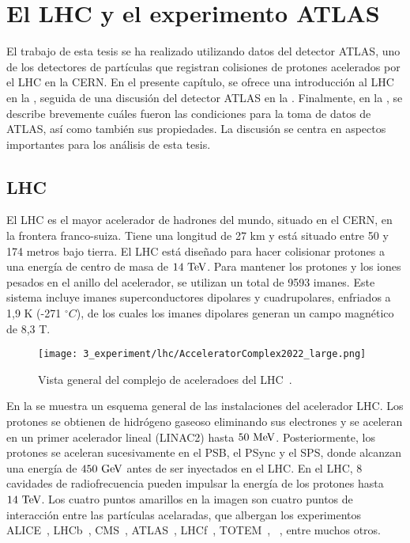 \chapter{El LHC y el experimento ATLAS}
\label{ch:atlas}


El trabajo de esta tesis se ha realizado utilizando datos del detector \ac{ATLAS}, uno de los detectores de partículas que registran colisiones de protones acelerados por el \acf{LHC} en la \ac{CERN}.
En el presente capítulo, se ofrece una introducción al \ac{LHC} en la \Sect{\ref{sec:atlas:LHC}}, seguida de una discusión del detector \ac{ATLAS} en la \Sect{\ref{sec:atlas:atlas}}. Finalmente, en la \Sect{\ref{sec:atlas:runs}}, se describe brevemente cu\'ales fueron las condiciones para la toma de datos de \ac{ATLAS}, as\'i como tambi\'en sus propiedades. La discusión se centra en aspectos importantes para los análisis de esta tesis.




\section{LHC}
\label{sec:atlas:LHC}

El \ac{LHC} \cite{LHC-TDR,LHC-Machine} es el mayor acelerador de hadrones del mundo, situado en el \ac{CERN}, en la frontera franco-suiza. Tiene una longitud de 27 km y está situado entre 50 y 174 metros bajo tierra.
El \ac{LHC} está diseñado para hacer colisionar protones a una energía de centro de masa de \(14~\text{TeV}\). Para mantener los protones y los iones pesados en el anillo del acelerador, se utilizan un total de 9593 imanes. Este sistema incluye imanes superconductores dipolares y cuadrupolares, enfriados a 1,9 K (-271 $^{\circ} C$), de los cuales los imanes dipolares generan un campo magnético de 8,3 T.

\begin{figure}[ht!]
    \centering
    \texttt{[image: 3\_experiment/lhc/AcceleratorComplex2022\_large.png]}
    \caption{Vista general del complejo de aceleradoes del \ac{LHC}~\cite{LHC-complex}.}
    \label{fig:atlas:lhc:lhc}
\end{figure}

En la \Fig{\ref{fig:atlas:lhc:lhc}} se muestra un esquema general de las instalaciones del acelerador \ac{LHC}. Los protones se obtienen de hidrógeno gaseoso eliminando sus electrones y se aceleran en un primer acelerador lineal (LINAC2) hasta \(50~\text{MeV}\). Posteriormente, los protones se aceleran sucesivamente en el \ac{PSB}, el \ac{PSync} y el \ac{SPS}, donde alcanzan una energía de \(450~\text{GeV}\) antes de ser inyectados en el \ac{LHC}. En el \ac{LHC}, 8 cavidades de radiofrecuencia pueden impulsar la energía de los protones hasta \(14~\text{TeV}\). Los cuatro puntos amarillos en la imagen \Fig{\ref{fig:atlas:lhc:lhc}} son cuatro puntos de interacción entre las part\'iculas acelaradas, que albergan los experimentos \ac{ALICE}~\cite{ALICE}, \acs{LHCb}~\cite{LHCb}, \acs{CMS}~\cite{CMS}, \acs{ATLAS}~\cite{ATLAS}, \acs{LHCf}~\cite{LHCf}, \acs{TOTEM}~\cite{TOTEM}, ~\cite{MoEDAL}, entre muchos otros.

